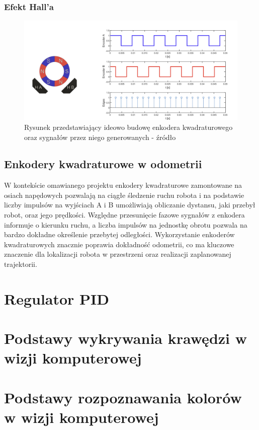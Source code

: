 \subsubsection{Efekt Hall'a}



\begin{figure}[h]
    \centering
    \includegraphics[width=1.0\textwidth]{./graf/enkoders.png}
    \caption{Rysunek przedstawiający ideowo budowę enkodera kwadraturowego oraz sygnałów przez niego generowanych - źródło \cite{bib:encoders-pid}}
    \label{rys2:encoders-graf}
\end{figure}

\subsection{Enkodery kwadraturowe w odometrii}

W kontekście omawianego projektu enkodery kwadraturowe zamontowane na osiach napędowych pozwalają na ciągłe śledzenie ruchu robota i na podstawie liczby impulsów na wyjściach A i B umożliwiają obliczanie dystansu, jaki przebył robot, oraz jego prędkości. Względne przesunięcie fazowe sygnałów z enkodera informuje o kierunku ruchu, a liczba impulsów na jednostkę obrotu pozwala na bardzo dokładne określenie przebytej odległości. Wykorzystanie enkoderów kwadraturowych znacznie poprawia dokładność odometrii, co ma kluczowe znaczenie dla lokalizacji robota w przestrzeni oraz realizacji zaplanowanej trajektorii.

\section{Regulator PID}


\section{Podstawy wykrywania krawędzi w wizji komputerowej}


\section{Podstawy rozpoznawania kolorów w wizji komputerowej}

